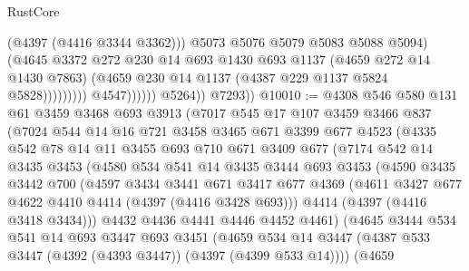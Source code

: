 \begin{lexlean}{RustCore}
\begin{coremodule}
                                        (@4397 (@4416 @3344 @3362)))
                                      @5073
                                      @5076
                                      @5079
                                      @5083
                                      @5088
                                      @5094)
                                    (@4645
                                      @3372
                                      @272
                                      @230
                                      @14
                                      @693
                                      @1430
                                      @693
                                      @1137
                                      (@4659 @272 @14 @1430 @7863)
                                      (@4659 @230 @14 @1137 (@4387 @229 @1137 @5824 @5828)))))))))
                        @4547))))))
            @5264))
        @7293))
@10010 := @4308
    @546
    @580
    @131
    @61
    @3459
    @3468
    @693
    @3913
    (@7017
      @545
      @17
      @107
      @3459
      @3466
      @837
      (@7024
        @544
        @14
        @16
        @721
        @3458
        @3465
        @671
        @3399
        @677
        @4523
        (@4335
          @542
          @78
          @14
          @11
          @3455
          @693
          @710
          @671
          @3409
          @677
          (@7174
            @542
            @14
            @3435
            @3453
            (@4580
              @534
              @541
              @14
              @3435
              @3444
              @693
              @3453
              (@4590
                @3435
                @3442
                @700
                (@4597
                  @3434
                  @3441
                  @671
                  @3417
                  @677
                  @4369
                  (@4611 @3427 @677 @4622 @4410 @4414 (@4397 (@4416 @3428 @693)))
                  @4414
                  (@4397 (@4416 @3418 @3434)))
                @4432
                @4436
                @4441
                @4446
                @4452
                @4461)
              (@4645
                @3444
                @534
                @541
                @14
                @693
                @3447
                @693
                @3451
                (@4659
                  @534
                  @14
                  @3447
                  (@4387 @533 @3447 (@4392 (@4393 @3447)) (@4397 (@4399 @533 @14))))
                (@4659

\end{coremodule}
\end{lexlean}
